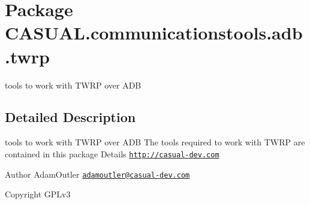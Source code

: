 \hypertarget{namespace_c_a_s_u_a_l_1_1communicationstools_1_1adb_1_1twrp}{\section{Package C\-A\-S\-U\-A\-L.\-communicationstools.\-adb.\-twrp}
\label{namespace_c_a_s_u_a_l_1_1communicationstools_1_1adb_1_1twrp}
}


tools to work with T\-W\-R\-P over A\-D\-B  




\subsection{Detailed Description}
tools to work with T\-W\-R\-P over A\-D\-B The tools required to work with T\-W\-R\-P are contained in this package Details \href{http://casual-dev.com}{\tt http\-://casual-\/dev.\-com} \begin{DoxyAuthor}{Author}
Adam\-Outler \href{mailto:adamoutler@casual-dev.com}{\tt adamoutler@casual-\/dev.\-com} 
\end{DoxyAuthor}
\begin{DoxyCopyright}{Copyright}
G\-P\-Lv3 
\end{DoxyCopyright}
